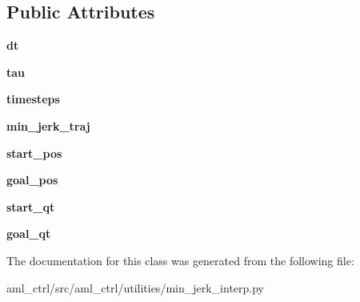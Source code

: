 \subsection*{Public Attributes}
\begin{DoxyCompactItemize}
\item 
\hypertarget{classaml__ctrl_1_1utilities_1_1min__jerk__interp_1_1_min_jerk_interp_a3cf50dd857ae275c6a9309c560a334f0}{{\bfseries dt}}\label{classaml__ctrl_1_1utilities_1_1min__jerk__interp_1_1_min_jerk_interp_a3cf50dd857ae275c6a9309c560a334f0}

\item 
\hypertarget{classaml__ctrl_1_1utilities_1_1min__jerk__interp_1_1_min_jerk_interp_abfbc4183bd40597d1f8ef549c8a954cd}{{\bfseries tau}}\label{classaml__ctrl_1_1utilities_1_1min__jerk__interp_1_1_min_jerk_interp_abfbc4183bd40597d1f8ef549c8a954cd}

\item 
\hypertarget{classaml__ctrl_1_1utilities_1_1min__jerk__interp_1_1_min_jerk_interp_a53f374cd9afb16fb0293c4f65987795d}{{\bfseries timesteps}}\label{classaml__ctrl_1_1utilities_1_1min__jerk__interp_1_1_min_jerk_interp_a53f374cd9afb16fb0293c4f65987795d}

\item 
\hypertarget{classaml__ctrl_1_1utilities_1_1min__jerk__interp_1_1_min_jerk_interp_a655ecaf3042fd23a9dea45fcac07c520}{{\bfseries min\-\_\-jerk\-\_\-traj}}\label{classaml__ctrl_1_1utilities_1_1min__jerk__interp_1_1_min_jerk_interp_a655ecaf3042fd23a9dea45fcac07c520}

\item 
\hypertarget{classaml__ctrl_1_1utilities_1_1min__jerk__interp_1_1_min_jerk_interp_a2154616a9adab36c591fc90b62ac66cc}{{\bfseries start\-\_\-pos}}\label{classaml__ctrl_1_1utilities_1_1min__jerk__interp_1_1_min_jerk_interp_a2154616a9adab36c591fc90b62ac66cc}

\item 
\hypertarget{classaml__ctrl_1_1utilities_1_1min__jerk__interp_1_1_min_jerk_interp_af33d73bed61d6eebe0ddbb1ca953a881}{{\bfseries goal\-\_\-pos}}\label{classaml__ctrl_1_1utilities_1_1min__jerk__interp_1_1_min_jerk_interp_af33d73bed61d6eebe0ddbb1ca953a881}

\item 
\hypertarget{classaml__ctrl_1_1utilities_1_1min__jerk__interp_1_1_min_jerk_interp_a1d7c1d1cc8b9b64922061d060d331d8a}{{\bfseries start\-\_\-qt}}\label{classaml__ctrl_1_1utilities_1_1min__jerk__interp_1_1_min_jerk_interp_a1d7c1d1cc8b9b64922061d060d331d8a}

\item 
\hypertarget{classaml__ctrl_1_1utilities_1_1min__jerk__interp_1_1_min_jerk_interp_a6aa537ca52a3e35e06ef582303e4501f}{{\bfseries goal\-\_\-qt}}\label{classaml__ctrl_1_1utilities_1_1min__jerk__interp_1_1_min_jerk_interp_a6aa537ca52a3e35e06ef582303e4501f}

\end{DoxyCompactItemize}


The documentation for this class was generated from the following file\-:\begin{DoxyCompactItemize}
\item 
aml\-\_\-ctrl/src/aml\-\_\-ctrl/utilities/min\-\_\-jerk\-\_\-interp.\-py\end{DoxyCompactItemize}
